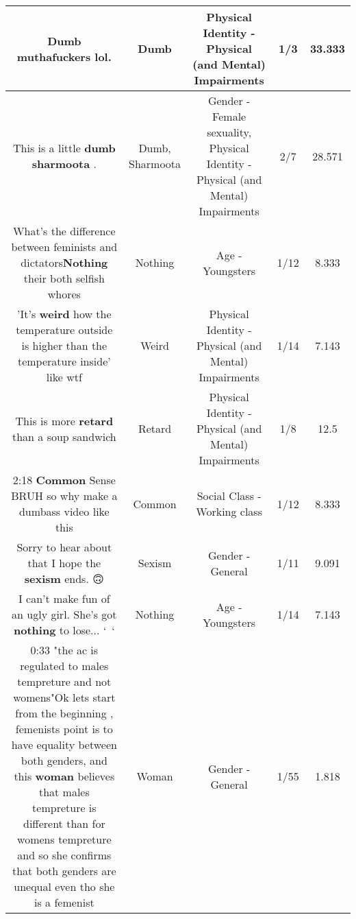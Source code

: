 \documentclass[11pt]{article}
\newlength\mylength
\begin{document}
\begin{center}
\begin{longtable}{|C{.65\mylength}|C{.30\mylength}|C{.12\mylength}|C{.12\mylength}|C{.12\mylength}|}
  \small Dumb muthafuckers lol.\normalsize   & Dumb & Physical Identity - Physical (and Mental) Impairments & 1/3 & 33.333 \\  \hline
  \small This is a little \textbf{dumb} \textbf{sharmoota} .\normalsize   & Dumb, Sharmoota & Gender - Female sexuality, Physical Identity - Physical (and Mental) Impairments & 2/7 & 28.571 \\  \hline
  \small What's the difference between feminists and dictators\textbf{Nothing} their both selfish whores\normalsize   & Nothing & Age - Youngsters & 1/12 & 8.333 \\  \hline
  \small 'It's \textbf{weird} how the temperature outside is higher than the temperature inside' like wtf\normalsize   & Weird & Physical Identity - Physical (and Mental) Impairments & 1/14 & 7.143 \\  \hline
  \small This is more \textbf{retard} than a soup sandwich\normalsize   & Retard & Physical Identity - Physical (and Mental) Impairments & 1/8 & 12.5 \\  \hline
  \small 2:18 \textbf{Common} Sense BRUH so why make a dumbass video like this\normalsize   & Common & Social Class - Working class & 1/12 & 8.333 \\  \hline
  \small Sorry to hear about that I hope the \textbf{sexism} ends. 🙃\normalsize   & Sexism & Gender - General & 1/11 & 9.091 \\  \hline
  \small I can't make fun of an ugly girl. She's got \textbf{nothing} to lose... `~`\normalsize   & Nothing & Age - Youngsters & 1/14 & 7.143 \\  \hline
  \small 0:33 "the ac is regulated to males tempreture and not womens"Ok lets start from the beginning , femenists point is to have equality between both genders, and this \textbf{woman} believes that males tempreture is different than for womens tempreture and so she confirms that both genders are unequal even tho she is a femenist\normalsize   & Woman & Gender - General & 1/55 & 1.818 \\  \hline

\end{longtable}
\end{center}
\end{document}
